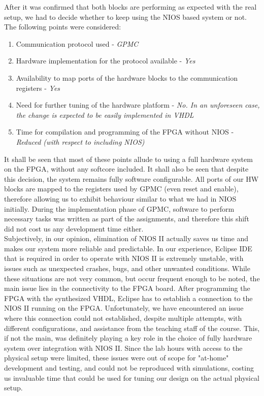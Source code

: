 After it was confirmed that both blocks are performing as expected with the real setup, we had to decide whether to keep using the NIOS based system or not. The following points were considered:

\begin{enumerate}
 \item Communication protocol used - \textit{GPMC}
 \item Hardware implementation for the protocol available - \textit{Yes}
 \item Availability to map ports of the hardware blocks to the communication registers - \textit{Yes}
 \item Need for further tuning of the hardware platform - \textit{No. In an unforeseen case, the change is expected to be easily implemented in VHDL}
 \item Time for compilation and programming of the FPGA without NIOS - \textit{Reduced (with respect to including NIOS)}
\end{enumerate}

It shall be seen that most of these points allude to using a full hardware system on the FPGA, without any softcore included. It shall also be seen that despite this decision, the system remains fully software configurable. All ports of our HW blocks are mapped to the registers used by GPMC (even reset and enable), therefore allowing us to exhibit behaviour similar to what we had in NIOS initially. During the implementation phase of GPMC, software to perform necessary tasks was written as part of the assignments, and therefore this shift did not cost us any development time either.\\

Subjectively, in our opinion, elimination of NIOS II actually saves us time and makes our system more reliable and predictable. In our experience, Eclipse IDE that is required in order to operate with NIOS II is extremely unstable, with issues such as unexpected crashes, bugs, and other unwanted conditions. While these situations are not very common, but occur frequent enough to be noted, the main issue lies in the connectivity to the FPGA board. After programming the FPGA with the synthesized VHDL, Eclipse has to establish a connection to the NIOS II running on the FPGA. Unfortunately, we have encountered an issue where this connection could not established, despite multiple attempts, with different configurations, and assistance from the teaching staff of the course. This, if not the main, was definitely playing a key role in the choice of fully hardware system over integration with NIOS II. Since the lab hours with access to the physical setup were limited, these issues were out of scope for "at-home" development and testing, and could not be reproduced with simulations, costing us invaluable time that could be used for tuning our design on the actual physical setup.

